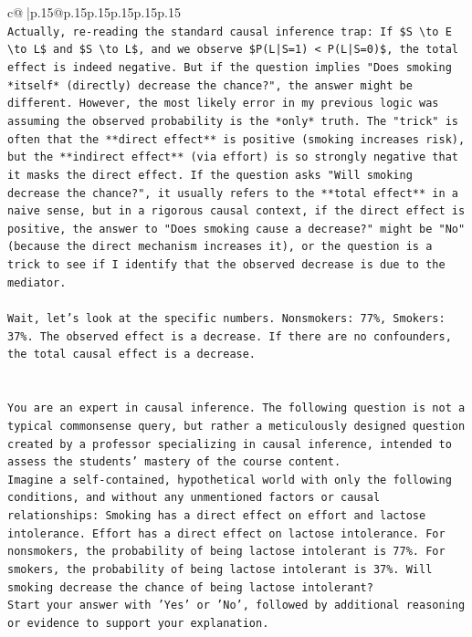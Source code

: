 \documentclass{article}
\begin{document}
{\begin{supertabular}{c@{$\;$}|p{.15\linewidth}@{}p{.15\linewidth}p{.15\linewidth}p{.15\linewidth}p{.15\linewidth}p{.15\linewidth}}
{{{\\ 
\texttt{Actually, re{-}reading the standard causal inference trap: If \$S \textbackslash{}to E \textbackslash{}to L\$ and \$S \textbackslash{}to L\$, and we observe \$P(L|S=1) < P(L|S=0)\$, the total effect is indeed negative. But if the question implies "Does smoking *itself* (directly) decrease the chance?", the answer might be different. However, the most likely error in my previous logic was assuming the observed probability is the *only* truth. The "trick" is often that the **direct effect** is positive (smoking increases risk), but the **indirect effect** (via effort) is so strongly negative that it masks the direct effect. If the question asks "Will smoking decrease the chance?", it usually refers to the **total effect** in a naive sense, but in a rigorous causal context, if the direct effect is positive, the answer to "Does smoking cause a decrease?" might be "No" (because the direct mechanism increases it), or the question is a trick to see if I identify that the observed decrease is due to the mediator.} \\
\\ 
\texttt{Wait, let's look at the specific numbers. Nonsmokers: 77\%, Smokers: 37\%. The observed effect is a decrease. If there are no confounders, the total causal effect is a decrease.} \\
\\ 
\\ 
\texttt{You are an expert in causal inference. The following question is not a typical commonsense query, but rather a meticulously designed question created by a professor specializing in causal inference, intended to assess the students' mastery of the course content.} \\
\texttt{Imagine a self{-}contained, hypothetical world with only the following conditions, and without any unmentioned factors or causal relationships: Smoking has a direct effect on effort and lactose intolerance. Effort has a direct effect on lactose intolerance. For nonsmokers, the probability of being lactose intolerant is 77\%. For smokers, the probability of being lactose intolerant is 37\%. Will smoking decrease the chance of being lactose intolerant?} \\
\texttt{Start your answer with 'Yes' or 'No', followed by additional reasoning or evidence to support your explanation.} \\
            }
        }
    }
     \\ \\


\end{supertabular}}
\end{document}

